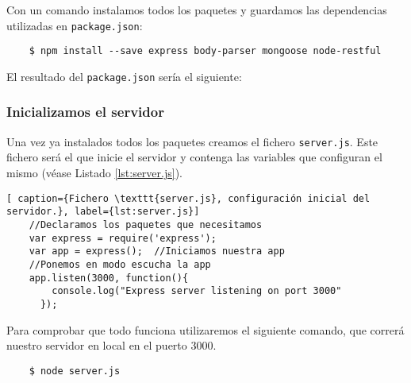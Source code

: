 Con un comando instalamos todos los paquetes y guardamos las dependencias utilizadas en \texttt{package.json}:

\begin{lstlisting}
    $ npm install --save express body-parser mongoose node-restful
\end{lstlisting}

El resultado del \texttt{package.json} sería el siguiente:


\subsubsection{Inicializamos el servidor}

Una vez ya instalados todos los paquetes creamos el fichero \texttt{server.js}. Este fichero será el que inicie el servidor y contenga las variables que configuran el mismo (véase Listado \ref{lst:server.js}). 


\begin{lstlisting}[ caption={Fichero \texttt{server.js}, configuración inicial del servidor.}, label={lst:server.js}]
    //Declaramos los paquetes que necesitamos
    var express = require('express');  
    var app = express();  //Iniciamos nuestra app
    //Ponemos en modo escucha la app
    app.listen(3000, function(){
        console.log("Express server listening on port 3000"
      });

\end{lstlisting}

Para comprobar que todo funciona utilizaremos el siguiente comando, que correrá nuestro servidor en local en el puerto 3000.
\begin{lstlisting}
    $ node server.js
\end{lstlisting}

